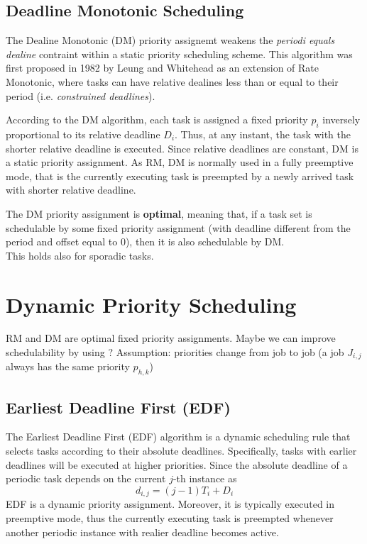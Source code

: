 \subsection{Deadline Monotonic Scheduling}
The Dealine Monotonic (DM) priority assignemt weakens the \textit{periodi equals dealine} contraint within a static priority scheduling scheme. This algorithm was first proposed in 1982 by Leung and Whitehead as an extension of Rate Monotonic, where tasks can have relative dealines less than or equal to their period (i.e. \textit{constrained deadlines}).

According to the DM algorithm, each task is assigned a fixed priority $p_i$ inversely proportional to its relative deadline $D_i$. Thus, at any instant, the task with the shorter relative deadline is executed. Since relative deadlines are constant, DM is a static priority assignment. As RM, DM is normally used in a fully preemptive mode, that is the currently executing task is preempted by a newly arrived task with shorter relative deadline.

The DM priority assignment is \textbf{optimal}, meaning that, if a task set is schedulable by some fixed priority assignment (with deadline different from the period and offset equal to 0), then it is also schedulable by DM.\\
This holds also for sporadic tasks.

\section{Dynamic Priority Scheduling}
RM and DM are optimal fixed priority assignments. Maybe we can improve schedulability by using ?
Assumption: priorities change from job to job (a job $J_{i,j}$ always has the same priority $p_{h,k}$)

\subsection{Earliest Deadline First (EDF)}

The Earliest Deadline First (EDF) algorithm is a dynamic scheduling rule that selects tasks according to their absolute deadlines. Specifically, tasks with earlier deadlines will be executed at higher priorities. Since the absolute deadline of a periodic task depends on the current $j$-th instance as
\[d_{i,j} = (j-1) T_i + D_i\]
EDF is a dynamic priority assignment. Moreover, it is typically executed in preemptive mode, thus the currently executing task is preempted whenever another periodic instance with realier deadline becomes active.

